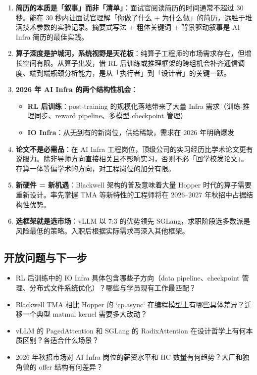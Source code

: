 \documentclass[a4paper]{article}
\begin{document}
\begin{enumerate}

\item \textbf{简历的本质是「叙事」而非「清单」}：面试官阅读简历的时间通常不超过 30 秒。能在 30 秒内让面试官理解「你做了什么 + 为什么做」的简历，远胜于堆满技术参数的实验记录。摘要式写法 + 粗体关键词 + 背景驱动叙事是 AI Infra 简历的最佳实践。

\item \textbf{算子深度是护城河，系统视野是天花板}：纯算子工程师的市场需求存在，但增长空间有限。从算子出发，借 RL 后训练或推理框架的跨组机会补齐通信调度、端到端瓶颈分析能力，是从「执行者」到「设计者」的关键一跃。

\item \textbf{2026 年 AI Infra 的两个结构性机会}：
\begin{itemize}
\item \textbf{RL 后训练}：post-training 的规模化落地带来了大量 Infra 需求（训练-推理同步、reward pipeline、多模型 checkpoint 管理）
\item \textbf{IO Infra}：从无到有的新岗位，供给稀缺，需求在 2026 年明确爆发
\end{itemize}

\item \textbf{论文不是必需品}：在 AI Infra 工程岗位，顶级公司的实习经历比学术论文更有说服力。除非导师方向直接相关且不影响实习，否则不必「回学校发论文」。存算一体等偏学术的方向，对工程岗位的加分有限。

\item \textbf{新硬件 = 新机遇}：Blackwell 架构的普及意味着大量 Hopper 时代的算子需要重新设计。率先掌握 TMA 等新特性的工程师将在 2026--2027 年秋招中占据结构性优势。

\item \textbf{选框架就是选市场}：vLLM 以 7:3 的优势领先 SGLang，求职阶段选多数派是风险最低的策略。入职后根据实际需求再深入其他框架。

\end{enumerate}

\subsection{开放问题与下一步}

\begin{itemize}
\item RL 后训练中的 IO Infra 具体包含哪些子方向（data pipeline、checkpoint 管理、分布式文件系统优化）？哪些与学员现有工作最匹配？
\item Blackwell TMA 相比 Hopper 的 `cp.async` 在编程模型上有哪些具体差异？迁移一个典型 matmul kernel 需要多大改动？
\item vLLM 的 PagedAttention 和 SGLang 的 RadixAttention 在设计哲学上有何本质区别？各适合什么场景？
\item 2026 年秋招市场对 AI Infra 岗位的薪资水平和 HC 数量有何趋势？大厂和独角兽的 offer 结构有何差异？
\end{itemize}
\end{document}
